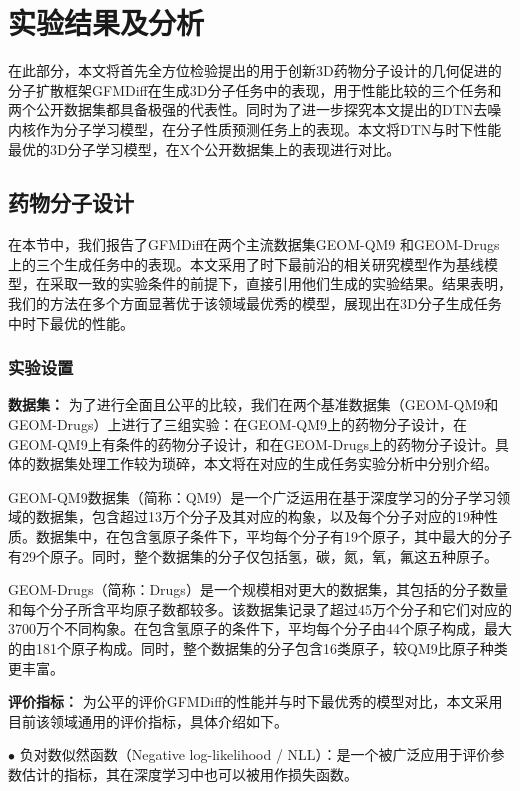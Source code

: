 \chapter{实验结果及分析}
\label{chap:experiment}

在此部分，本文将首先全方位检验提出的用于创新3D药物分子设计的几何促进的分子扩散框架GFMDiff在生成3D分子任务中的表现，用于性能比较的三个任务和两个公开数据集都具备极强的代表性。同时为了进一步探究本文提出的DTN去噪内核作为分子学习模型，在分子性质预测任务上的表现。本文将DTN与时下性能最优的3D分子学习模型，在X个公开数据集上的表现进行对比。

\section{药物分子设计}
在本节中，我们报告了GFMDiff在两个主流数据集GEOM-QM9 \cite{qm9_ramakrishnan_14}和GEOM-Drugs \cite{drugs_axelrod_22}上的三个生成任务中的表现。本文采用了时下最前沿的相关研究模型作为基线模型，在采取一致的实验条件的前提下，直接引用他们生成的实验结果。结果表明，我们的方法在多个方面显著优于该领域最优秀的模型，展现出在3D分子生成任务中时下最优的性能。

\subsection{实验设置}

\textbf{数据集：}
为了进行全面且公平的比较，我们在两个基准数据集（GEOM-QM9和GEOM-Drugs）上进行了三组实验：在GEOM-QM9上的药物分子设计，在GEOM-QM9上有条件的药物分子设计，和在GEOM-Drugs上的药物分子设计。具体的数据集处理工作较为琐碎，本文将在对应的生成任务实验分析中分别介绍。

GEOM-QM9数据集（简称：QM9）是一个广泛运用在基于深度学习的分子学习领域的数据集，包含超过13万个分子及其对应的构象，以及每个分子对应的19种性质。数据集中，在包含氢原子条件下，平均每个分子有19个原子，其中最大的分子有29个原子。同时，整个数据集的分子仅包括氢，碳，氮，氧，氟这五种原子。

GEOM-Drugs（简称：Drugs）是一个规模相对更大的数据集，其包括的分子数量和每个分子所含平均原子数都较多。该数据集记录了超过45万个分子和它们对应的3700万个不同构象。在包含氢原子的条件下，平均每个分子由44个原子构成，最大的由181个原子构成。同时，整个数据集的分子包含16类原子，较QM9比原子种类更丰富。

\textbf{评价指标：}
为公平的评价GFMDiff的性能并与时下最优秀的模型对比，本文采用目前该领域通用的评价指标，具体介绍如下。

$\bullet$ 负对数似然函数（Negative log-likelihood / NLL）：是一个被广泛应用于评价参数估计的指标，其在深度学习中也可以被用作损失函数。

